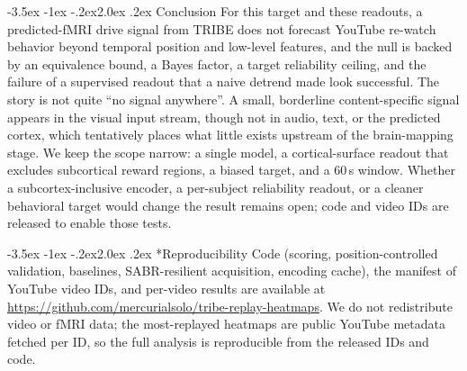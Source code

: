 \documentclass[11pt]{article}
\makeatletter
\renewcommand\section{\@startsection{section}{1}{\z@}%
  {-3.5ex \@plus -1ex \@minus -.2ex}{2.0ex \@plus.2ex}%
  {\normalfont\large\sffamily\bfseries}}
\makeatother
\begin{document}
\section{Conclusion}
For this target and these readouts, a predicted-fMRI drive signal from TRIBE does not forecast
YouTube re-watch behavior beyond temporal position and low-level features, and the null is backed
by an equivalence bound, a Bayes factor, a target reliability ceiling, and the failure of a
supervised readout that a naive detrend made look successful. The story is not quite ``no signal
anywhere''. A small, borderline content-specific signal appears in the visual input stream, though
not in audio, text, or the predicted cortex, which tentatively places what little exists upstream of
the brain-mapping stage. We keep the scope narrow: a
single model, a cortical-surface readout that excludes subcortical reward regions, a biased target,
and a $60$\,s window. Whether a subcortex-inclusive encoder, a per-subject reliability readout, or a
cleaner behavioral target would change the result remains open; code and video IDs are released to
enable those tests.

\section*{Reproducibility}
Code (scoring, position-controlled validation, baselines, SABR-resilient acquisition, encoding
cache), the manifest of YouTube video IDs, and per-video results are available at
\url{https://github.com/mercurialsolo/tribe-replay-heatmaps}. We do not redistribute video or fMRI
data; the most-replayed heatmaps are public YouTube metadata fetched per ID, so the full analysis
is reproducible from the released IDs and code.
\end{document}
